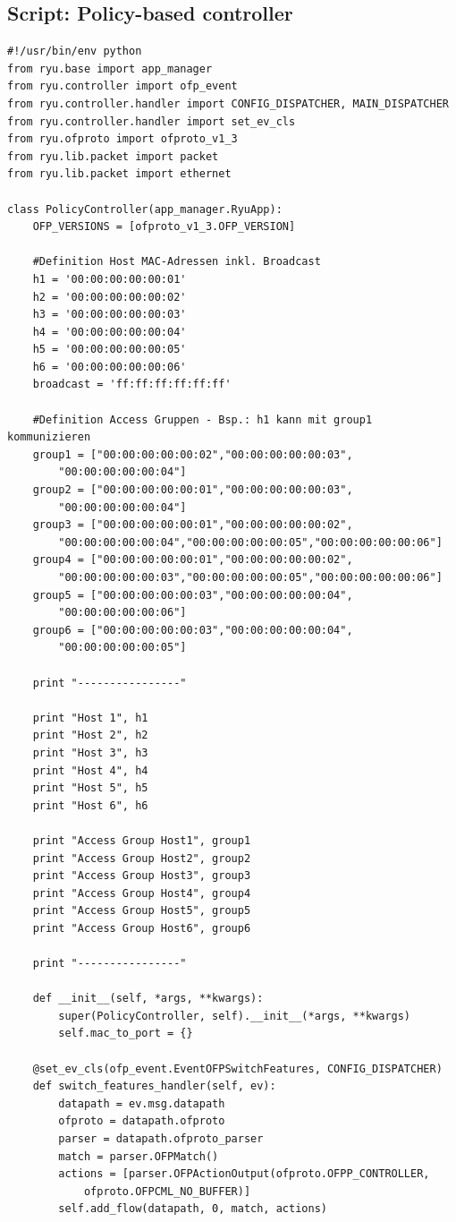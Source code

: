 \documentclass[a4,12pt]{scrartcl}
\begin{document}
\subsection{Script: Policy-based controller}
\begin{lstlisting}
#!/usr/bin/env python
from ryu.base import app_manager
from ryu.controller import ofp_event
from ryu.controller.handler import CONFIG_DISPATCHER, MAIN_DISPATCHER
from ryu.controller.handler import set_ev_cls
from ryu.ofproto import ofproto_v1_3
from ryu.lib.packet import packet
from ryu.lib.packet import ethernet
         
class PolicyController(app_manager.RyuApp):
    OFP_VERSIONS = [ofproto_v1_3.OFP_VERSION]
    
    #Definition Host MAC-Adressen inkl. Broadcast
    h1 = '00:00:00:00:00:01'
    h2 = '00:00:00:00:00:02'
    h3 = '00:00:00:00:00:03'
    h4 = '00:00:00:00:00:04'
    h5 = '00:00:00:00:00:05'
    h6 = '00:00:00:00:00:06'
    broadcast = 'ff:ff:ff:ff:ff:ff'
    
    #Definition Access Gruppen - Bsp.: h1 kann mit group1 kommunizieren
    group1 = ["00:00:00:00:00:02","00:00:00:00:00:03",
    	"00:00:00:00:00:04"]
    group2 = ["00:00:00:00:00:01","00:00:00:00:00:03",
    	"00:00:00:00:00:04"]
    group3 = ["00:00:00:00:00:01","00:00:00:00:00:02",
    	"00:00:00:00:00:04","00:00:00:00:00:05","00:00:00:00:00:06"]
    group4 = ["00:00:00:00:00:01","00:00:00:00:00:02",
    	"00:00:00:00:00:03","00:00:00:00:00:05","00:00:00:00:00:06"]
    group5 = ["00:00:00:00:00:03","00:00:00:00:00:04",
    	"00:00:00:00:00:06"]
    group6 = ["00:00:00:00:00:03","00:00:00:00:00:04",
    	"00:00:00:00:00:05"]

    print "----------------"

    print "Host 1", h1
    print "Host 2", h2
    print "Host 3", h3
    print "Host 4", h4
    print "Host 5", h5
    print "Host 6", h6

    print "Access Group Host1", group1
    print "Access Group Host2", group2
    print "Access Group Host3", group3
    print "Access Group Host4", group4
    print "Access Group Host5", group5
    print "Access Group Host6", group6    
    
    print "----------------"

    def __init__(self, *args, **kwargs):
        super(PolicyController, self).__init__(*args, **kwargs)
        self.mac_to_port = {}

    @set_ev_cls(ofp_event.EventOFPSwitchFeatures, CONFIG_DISPATCHER)
    def switch_features_handler(self, ev):
        datapath = ev.msg.datapath
        ofproto = datapath.ofproto
        parser = datapath.ofproto_parser
        match = parser.OFPMatch()
        actions = [parser.OFPActionOutput(ofproto.OFPP_CONTROLLER, 
        	ofproto.OFPCML_NO_BUFFER)]
        self.add_flow(datapath, 0, match, actions)


\end{lstlisting}
\end{document}
